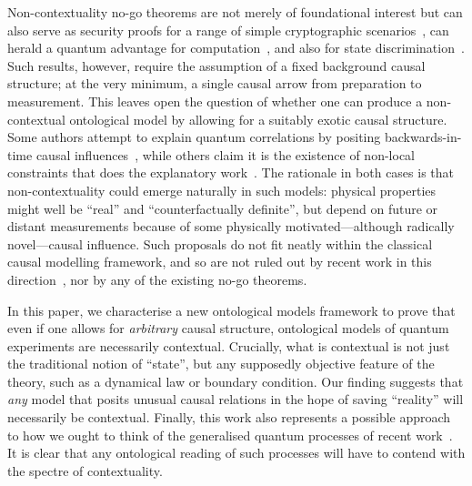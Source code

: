 \documentclass[a4paper,onecolumn,11pt,accepted=2018-05-04]{quantumarticle}
\begin{document}
Non-contextuality no-go theorems are not merely of foundational interest but can also serve as security proofs for a range of simple cryptographic scenarios~\cite{chailloux2016, spekkens09}, can herald a quantum advantage for computation~\cite{Howard2014}, and also for state discrimination~\cite{Schmid2017}. Such results, however, require the assumption of a fixed background causal structure; at the very minimum, a single causal arrow from preparation to measurement. This leaves open the question of whether one can produce a non-contextual ontological model by allowing for a suitably exotic causal structure.  Some authors attempt to explain quantum correlations by positing backwards-in-time causal influences~\cite{price2012, priceWharton2015, Evans01062013, Wharton2014, Aharonov2016, Leifer2016, Sutherland17}, while others claim it is the existence of non-local constraints that does the explanatory work~\cite{carati1999nonlocality, Weinstein2009}. The rationale in both cases is that non-contextuality could emerge naturally in such models: physical properties might well be ``real'' and ``counterfactually definite'', but depend on future or distant measurements because of some physically motivated---although radically novel---causal influence.  Such proposals do not fit neatly within the classical causal modelling framework, and so are not ruled out by recent work in this direction~\cite{wood2015, cavalcanti2017}, nor by any of the existing no-go theorems. 

In this paper, we characterise a new ontological models framework to prove  that even if one allows for \emph{arbitrary} causal structure, ontological models of quantum experiments are necessarily contextual. Crucially, what is contextual is not just the traditional notion of ``state'', but any supposedly objective feature of the theory, such as a dynamical law or boundary condition. Our finding suggests that \emph{any} model that posits unusual causal relations in the hope of saving ``reality'' will necessarily be contextual.  
Finally, this work also represents a possible approach to how we ought to think of the generalised quantum processes of recent work~\cite{gutoski06, chiribella08, Chiribella2008, chiribella09b, Bisio2011, Bisio2014, oreshkov12, modioperational2012, Leifer2013, Ringbauer2015, pollockcomplete2015, costa2016, Allen2016, Milz2016, shrapnel2017}. It is clear that any ontological reading of such processes will have to contend with the spectre of contextuality.
\end{document}
